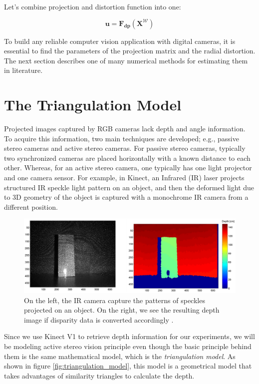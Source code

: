 \documentclass[a4paper]{report}
\numberwithin{figure}{section}
\begin{document}
Let's combine projection and distortion function into one:

\begin{equation}\label{eq:simplyfied_dist_proj_func}
  \mathbf{u} = \mathbf{F_{dp}}(\mathbf{X^{\mathcal{W}}})
\end{equation} 


To build any reliable computer vision application with digital cameras, it is 
essential to find the parameters of the projection matrix and the radial 
distortion.  The next section describes one of many numerical methods for 
estimating them in literature.

\section{The Triangulation Model} \label{sc_depth_model}

Projected images captured by RGB cameras lack depth and angle information. To 
acquire this information, two main techniques are developed; e.g., passive 
stereo cameras and active stereo cameras. For passive stereo cameras, 
typically two synchronized cameras are placed horizontally with a known 
distance to each other. 
Whereas, for an active stereo camera, one typically has one light projector 
and one camera sensor. For example, in Kinect, an Infrared (IR) laser projects 
structured IR speckle light pattern on an object, and then the deformed light 
due to 3D geometry of the object is captured with a monochrome IR camera from 
a different position.

\begin{figure}[H]
	\centering
  \includegraphics[width=0.7\linewidth,natwidth=640,natheight=640]
  {fig/ref_imgs/kinect_depth_img.png}
  \caption[Kinect's Depth Measurement]{On the left, the IR camera capture the 
  patterns of speckles projected on an object. On the right, we see the 
  resulting depth image if disparity data is converted accordingly 
  \parencite{Khoshelham2012a}.}
	\label{fig:kinect_depth_img}
\end{figure}

Since we use Kinect V1 to retrieve depth information for our experiments, we will 
be modeling active stereo vision principle even though the basic principle 
behind them is the same mathematical model, which is the \textit{triangulation 
model}. As shown in figure \ref{fig:triangulation_model}, this model is a 
geometrical model that takes advantages of similarity triangles to calculate 
the depth.
\end{document}
